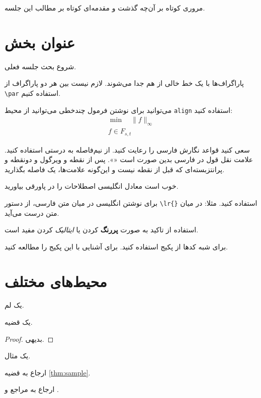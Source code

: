 
مروری کوتاه بر آن‌چه گذشت و مقدمه‌ای کوتاه بر مطالب این جلسه. 

\section{عنوان بخش}
شروع بحث جلسه فعلی. 

پاراگراف‌ها با یک خط خالی از هم جدا می‌شوند. لازم نیست بین هر دو پاراگراف از \verb|\par|  استفاده کنیم.

می‌توانید برای نوشتن فرمول چندخطی می‌توانید از محیط \verb|align| استفاده کنید:
\begin{align*} 
\min \quad \| f \|_{\infty}\\ 
f \in F_{s,t} 
\end{align*}

سعی کنید قواعد نگارش فارسی را رعایت کنید. از نیم‌فاصله
به درستی استفاده کنید. علامت نقل قول در فارسی بدین صورت است «». پس از نقطه و ویرگول و دونقطه و پرانتزبسته‌ای که قبل از نقطه نیست و این‌گونه علامت‌ها، یک فاصله بگذارید.

خوب است معادل انگلیسی اصطلاحات را در پاورقی%
بیاورید.

برای نوشتن انگلیسی در میان متن فارسی، از دستور \verb+\lr{}+ استفاده کنید. 
مثلا:
در میان متن درست می‌آید.

استفاده از تاکید به صورت 
\textbf{پررنگ}
کردن یا 
\textit{ایتالیک}
کردن مفید است. 

برای شبه کدها از پکیج
استفاده کنید. برای آشنایی با این پکیج
را مطالعه کنید.


\section{محیط‌های مختلف}
\begin{lemma}
	یک لم.
\end{lemma}
\begin{theorem}
	\label{thm:sample}
	یک قضیه. 
\end{theorem}
\begin{proof}
	بدیهی.
\end{proof}

\begin{example}
	یک مثال. 
\end{example}

ارجاع به قضیه 
\ref{thm:sample}.

ارجاع به مراجع
\cite{lecture1}
و
\cite{CLRS}.


